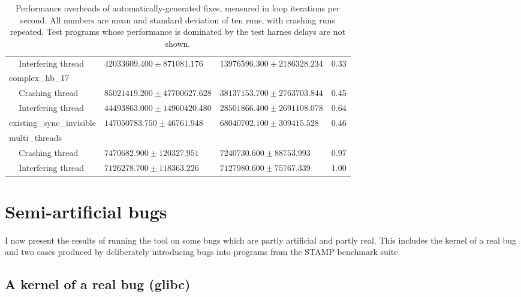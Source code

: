 \begin{sidewaystable}
\begin{tabular}{lllll}
  & \multicolumn{1}{l}{Interfering thread} & $42033609.400 \pm 871081.176$ & $13976596.300 \pm 2186328.234$ & 0.33\\
  \multicolumn{2}{l}{complex\_hb\_17               } \\
  & \multicolumn{1}{l}{Crashing thread} & $85021419.200 \pm 47700627.628$ & $38137153.700 \pm 2763703.844$ & 0.45\\
  & \multicolumn{1}{l}{Interfering thread} & $44493863.000 \pm 14960420.480$ & $28501866.400 \pm 2691108.078$ & 0.64\\
  \multicolumn{2}{l}{existing\_sync\_invisible     }  & $147050783.750 \pm 46761.948$ & $68040702.100 \pm 309415.528$ & 0.46\\
  \multicolumn{2}{l}{multi\_threads                } \\
  & \multicolumn{1}{l}{Crashing thread} & $7470682.900 \pm 120327.951$ & $7240730.600 \pm 88753.993$ & 0.97\\
  & \multicolumn{1}{l}{Interfering thread} & $7126278.700 \pm 118363.226$ & $7127980.600 \pm 75767.339$ & 1.00\\
  \end{tabular}
  \caption{Performance overheads of automatically-generated fixes,
    measured in loop iterations per second.  All numbers are mean and
    standard deviation of ten runs, with crashing runs repeated.  Test
    programs whose performance is dominated by the test harnes delays
    are not shown.}
  \label{table:eval:fix_overheads}
\end{sidewaystable}

\section{Semi-artificial bugs}
\label{sect:eval:semiartificial}

I now present the results of running the tool on some bugs which are
partly artificial and partly real.  This includes the kernel of a real
bug and two cases produced by deliberately introducing bugs into
programs from the STAMP benchmark suite\needCite{}.

\subsection{A kernel of a real bug (glibc)}
\label{sect:eval:glibc}


